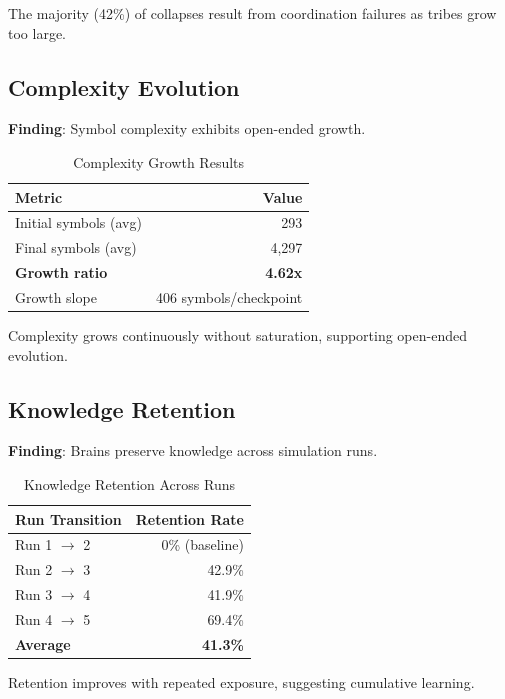 \documentclass[11pt,a4paper]{article}
\begin{document}
The majority (42\%) of collapses result from coordination failures as tribes grow too large.

\subsection{Complexity Evolution}

\textbf{Finding}: Symbol complexity exhibits open-ended growth.

\begin{table}[htbp]
\centering
\caption{Complexity Growth Results}
\label{tab:complexity}
\begin{tabular}{@{}lr@{}}
\toprule
Metric & Value \\
\midrule
Initial symbols (avg) & 293 \\
Final symbols (avg) & 4,297 \\
\textbf{Growth ratio} & \textbf{4.62x} \\
Growth slope & 406 symbols/checkpoint \\
\bottomrule
\end{tabular}
\end{table}

Complexity grows continuously without saturation, supporting open-ended evolution.

\subsection{Knowledge Retention}

\textbf{Finding}: Brains preserve knowledge across simulation runs.

\begin{table}[htbp]
\centering
\caption{Knowledge Retention Across Runs}
\label{tab:retention}
\begin{tabular}{@{}lr@{}}
\toprule
Run Transition & Retention Rate \\
\midrule
Run 1 $\rightarrow$ 2 & 0\% (baseline) \\
Run 2 $\rightarrow$ 3 & 42.9\% \\
Run 3 $\rightarrow$ 4 & 41.9\% \\
Run 4 $\rightarrow$ 5 & 69.4\% \\
\textbf{Average} & \textbf{41.3\%} \\
\bottomrule
\end{tabular}
\end{table}

Retention improves with repeated exposure, suggesting cumulative learning.
\end{document}
